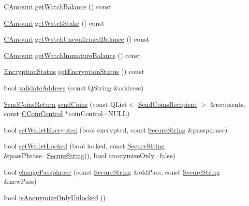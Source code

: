 \begin{DoxyCompactItemize}
\hyperlink{amount_8h_a4eaf3a5239714d8c45b851527f7cb564}{C\+Amount} \hyperlink{class_wallet_model_a25431d4707b868c51101b96ab939e130}{get\+Watch\+Balance} () const 
\item 
\hyperlink{amount_8h_a4eaf3a5239714d8c45b851527f7cb564}{C\+Amount} \hyperlink{class_wallet_model_ae335ec786cc8d6785820220a1f9a9028}{get\+Watch\+Stake} () const 
\item 
\hyperlink{amount_8h_a4eaf3a5239714d8c45b851527f7cb564}{C\+Amount} \hyperlink{class_wallet_model_a4d3e97dd5e32d9f97d27eea63ffcdaa9}{get\+Watch\+Unconfirmed\+Balance} () const 
\item 
\hyperlink{amount_8h_a4eaf3a5239714d8c45b851527f7cb564}{C\+Amount} \hyperlink{class_wallet_model_a59b25dea51861206de127e47074d9b8c}{get\+Watch\+Immature\+Balance} () const 
\item 
\hyperlink{class_wallet_model_a58f6f0bb5a7b8b4e4d0812185ccc0616}{Encryption\+Status} \hyperlink{class_wallet_model_acfb62be638267bbf1bf498fb6501c31d}{get\+Encryption\+Status} () const 
\item 
bool \hyperlink{class_wallet_model_a04604615253aeaae1253b1412a70a1f7}{validate\+Address} (const Q\+String \&address)
\item 
\hyperlink{struct_wallet_model_1_1_send_coins_return}{Send\+Coins\+Return} \hyperlink{class_wallet_model_a497418d4a8566b881bab45dec7ad8fd8}{send\+Coins} (const Q\+List$<$ \hyperlink{class_send_coins_recipient}{Send\+Coins\+Recipient} $>$ \&recipients, const \hyperlink{class_c_coin_control}{C\+Coin\+Control} $\ast$coin\+Control=N\+U\+L\+L)
\item 
bool \hyperlink{class_wallet_model_a444340830badcd48e3a4dd6b03d9c4d7}{set\+Wallet\+Encrypted} (bool encrypted, const \hyperlink{allocators_8h_a396ed773a5ac24aec28c8f7dc413c7ac}{Secure\+String} \&passphrase)
\item 
bool \hyperlink{class_wallet_model_a5a8b65bfaecb0813d64c733f4f34f090}{set\+Wallet\+Locked} (bool locked, const \hyperlink{allocators_8h_a396ed773a5ac24aec28c8f7dc413c7ac}{Secure\+String} \&pass\+Phrase=\hyperlink{allocators_8h_a396ed773a5ac24aec28c8f7dc413c7ac}{Secure\+String}(), bool anonymize\+Only=false)
\item 
bool \hyperlink{class_wallet_model_a67ebff3f267b5c9973c0465184c085a4}{change\+Passphrase} (const \hyperlink{allocators_8h_a396ed773a5ac24aec28c8f7dc413c7ac}{Secure\+String} \&old\+Pass, const \hyperlink{allocators_8h_a396ed773a5ac24aec28c8f7dc413c7ac}{Secure\+String} \&new\+Pass)
\item 
bool \hyperlink{class_wallet_model_ad170da7fccb70726a4527d67c8f26340}{is\+Anonymize\+Only\+Unlocked} ()

\end{DoxyCompactItemize}
